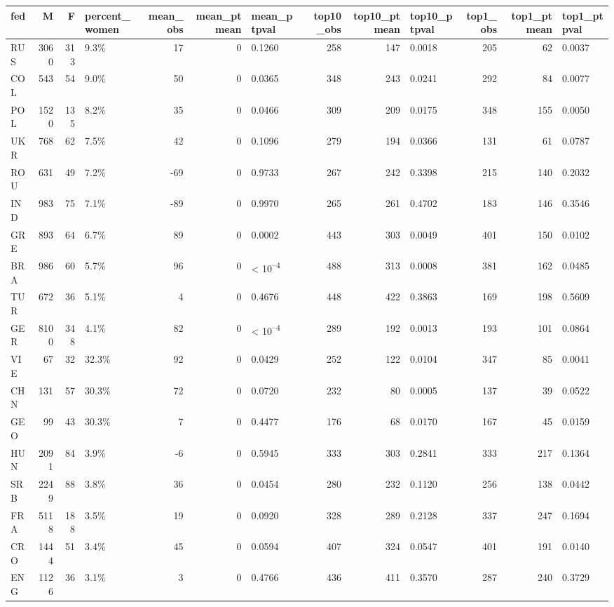 
\begin{tabular}{l|r|r|l|r|r|l|r|r|l|r|r|l}
\hline
fed & M & F & percent_women & mean_obs & mean_ptmean & mean_ptpval & top10_obs & top10_ptmean & top10_ptpval & top1_obs & top1_ptmean & top1_ptpval\\
\hline
RUS & 3060 & 313 & 9.3\% & 17 & 0 & 0.1260 & 258 & 147 & 0.0018 & 205 & 62 & 0.0037\\
\hline
COL & 543 & 54 & 9.0\% & 50 & 0 & 0.0365 & 348 & 243 & 0.0241 & 292 & 84 & 0.0077\\
\hline
POL & 1520 & 135 & 8.2\% & 35 & 0 & 0.0466 & 309 & 209 & 0.0175 & 348 & 155 & 0.0050\\
\hline
UKR & 768 & 62 & 7.5\% & 42 & 0 & 0.1096 & 279 & 194 & 0.0366 & 131 & 61 & 0.0787\\
\hline
ROU & 631 & 49 & 7.2\% & -69 & 0 & 0.9733 & 267 & 242 & 0.3398 & 215 & 140 & 0.2032\\
\hline
IND & 983 & 75 & 7.1\% & -89 & 0 & 0.9970 & 265 & 261 & 0.4702 & 183 & 146 & 0.3546\\
\hline
GRE & 893 & 64 & 6.7\% & 89 & 0 & 0.0002 & 443 & 303 & 0.0049 & 401 & 150 & 0.0102\\
\hline
BRA & 986 & 60 & 5.7\% & 96 & 0 & < 10\textsuperscript{--4} & 488 & 313 & 0.0008 & 381 & 162 & 0.0485\\
\hline
TUR & 672 & 36 & 5.1\% & 4 & 0 & 0.4676 & 448 & 422 & 0.3863 & 169 & 198 & 0.5609\\
\hline
GER & 8100 & 348 & 4.1\% & 82 & 0 & < 10\textsuperscript{--4} & 289 & 192 & 0.0013 & 193 & 101 & 0.0864\\
\hline
VIE & 67 & 32 & 32.3\% & 92 & 0 & 0.0429 & 252 & 122 & 0.0104 & 347 & 85 & 0.0041\\
\hline
CHN & 131 & 57 & 30.3\% & 72 & 0 & 0.0720 & 232 & 80 & 0.0005 & 137 & 39 & 0.0522\\
\hline
GEO & 99 & 43 & 30.3\% & 7 & 0 & 0.4477 & 176 & 68 & 0.0170 & 167 & 45 & 0.0159\\
\hline
HUN & 2091 & 84 & 3.9\% & -6 & 0 & 0.5945 & 333 & 303 & 0.2841 & 333 & 217 & 0.1364\\
\hline
SRB & 2249 & 88 & 3.8\% & 36 & 0 & 0.0454 & 280 & 232 & 0.1120 & 256 & 138 & 0.0442\\
\hline
FRA & 5118 & 188 & 3.5\% & 19 & 0 & 0.0920 & 328 & 289 & 0.2128 & 337 & 247 & 0.1694\\
\hline
CRO & 1444 & 51 & 3.4\% & 45 & 0 & 0.0594 & 407 & 324 & 0.0547 & 401 & 191 & 0.0140\\
\hline
ENG & 1126 & 36 & 3.1\% & 3 & 0 & 0.4766 & 436 & 411 & 0.3570 & 287 & 240 & 0.3729\\

\end{tabular}
